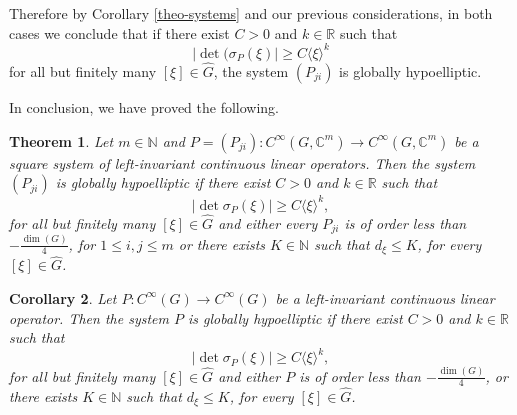 \documentclass[11pt]{amsart}
\newtheorem{theorem}{Theorem}
\numberwithin{theorem}{section}
\numberwithin{equation}{section}
\newtheorem{corollary}[theorem]{Corollary}
\theoremstyle{definition}
\numberwithin{example}{section}
\theoremstyle{definition}
\theoremstyle{definition}
\newcommand{\R}{\mathbb{R}}
\newcommand{\N}{\mathbb{N}}
\begin{document}
Therefore by Corollary \ref{theo-systems} and our previous considerations, in both cases we conclude that if there exist $C>0$ and $k\in\R$ such that 
\begin{equation*}
    |\det(\sigma_P(\xi)|\geq C\langle \xi \rangle ^k
\end{equation*}
for all but finitely many $[\xi]\in\widehat{G}$, the system $(P_{ji})$ is globally hypoelliptic.


In conclusion, we have proved the following.
\begin{theorem}
    Let $m\in\N$ and $P=(P_{ji}):C^\infty(G,\mathbb{C}^m)\to C^\infty(G,\mathbb{C}^m)$ be a square system of left-invariant continuous linear operators. Then the system $(P_{ji})$ is globally hypoelliptic if there exist $C>0$ and $k\in\R$ such that
    \begin{equation*}
        |\det \sigma_P(\xi)|\geq C\langle\xi\rangle^k,
    \end{equation*}
    for all but finitely many $[\xi]\in\widehat{G}$
    and either every 
    $P_{ji}$ is of order less than $-\frac{\dim(G)}{4}$, for $1\leq i,j\leq m$ or there exists $K\in \N$ such that $d_\xi\leq K$, for every $[\xi]\in\widehat{G}$.
\end{theorem}
\begin{corollary}
    Let $P:C^\infty(G)\to C^\infty(G)$ be a left-invariant continuous linear operator. Then the system $P$ is globally hypoelliptic if there exist $C>0$ and $k\in\R$ such that
    \begin{equation*}
        |\det \sigma_P(\xi)|\geq C\langle\xi\rangle^k,
    \end{equation*}
    for all but finitely many $[\xi]\in\widehat{G}$
    and either $P$ is of order less than $-\frac{\dim(G)}{4}$, or there exists $K\in \N$ such that $d_\xi\leq K$, for every $[\xi]\in\widehat{G}$.
\end{corollary}
\end{document}
